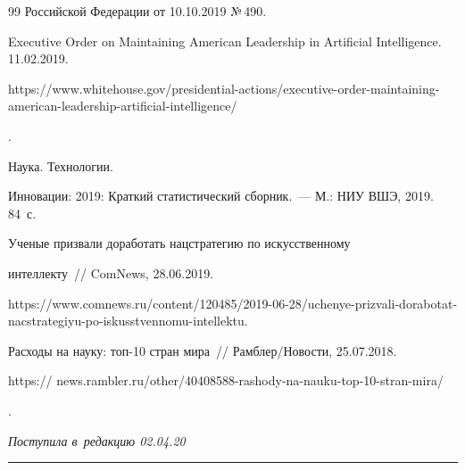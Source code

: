 {{\begin{thebibliography}{99}
Российской Федерации от 10.10.2019 №\,490.


Executive Order on Maintaining American Leadership in Artificial Intelligence. 11.02.2019. {\sf 

https://www.whitehouse.gov/presidential-actions/executive-order-maintaining-american-leadership-artificial-intelligence/}. 




 Наука. Технологии. 

Инновации: 2019: Краткий статистический сборник.~--- М.: НИУ ВШЭ, 2019. 84~с.




 Ученые призвали доработать нацстратегию по искусственному 

интеллекту~/\!\!/ ComNews, 28.06.2019. {\sf  

https://www.comnews.ru/content/120485/2019-06-28/uchenye-prizvali-dorabotat-nacstrategiyu-po-iskusstvennomu-intellektu.}




Расходы на науку: топ-10 стран мира~/\!\!/ Рамблер/Новости, 25.07.2018. {\sf 

https:// news.rambler.ru/other/40408588-rashody-na-nauku-top-10-stran-mira/}.

    \end{thebibliography}

} }





\vspace*{-3pt}



\hfill{\small\textit{Поступила в~редакцию 02.04.20}}









\vspace*{6pt}



\hrule



\vspace*{2pt}






